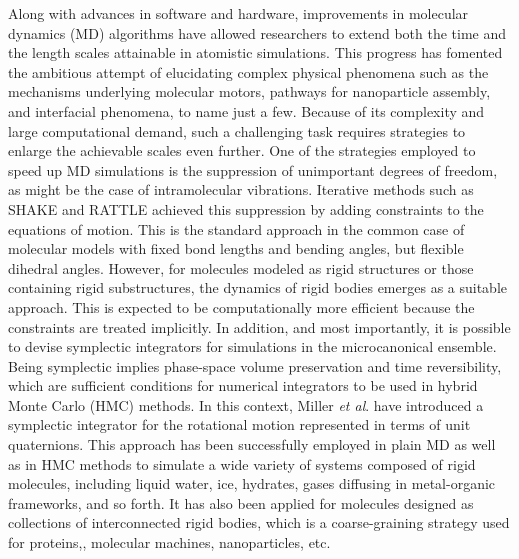 \documentclass[aip,jcp,reprint,amsmath,amssymb]{revtex4-1}
\begin{document}
\begin{itemize}
Along with advances in software and hardware, improvements in molecular dynamics (MD) algorithms have allowed researchers to extend both the time and the length scales attainable in atomistic simulations. This progress has fomented the ambitious attempt of elucidating complex physical phenomena such as the mechanisms underlying molecular motors, pathways for nanoparticle assembly, and interfacial phenomena, to name just a few. Because of its complexity and large computational demand, such a challenging task requires strategies to enlarge the achievable scales even further. One of the strategies employed to speed up MD simulations is the suppression of unimportant degrees of freedom, as might be the case of intramolecular vibrations. Iterative methods such as SHAKE\cite{Ryckaert1977} and RATTLE\cite{Andersen1983} achieved this suppression by adding constraints to the equations of motion. This is the standard approach in the common case of molecular models with fixed bond lengths and bending angles, but flexible dihedral angles. However, for molecules modeled as rigid structures or those containing rigid substructures,\cite{Miller2002} the dynamics of rigid bodies emerges as a suitable approach. This is expected to be computationally more efficient because the constraints are treated implicitly. In addition, and most importantly, it is possible to devise symplectic integrators for simulations in the microcanonical ensemble. Being symplectic implies phase-space volume preservation and time reversibility, which are sufficient conditions for numerical integrators to be used in hybrid Monte Carlo (HMC) methods.\cite{Duane1987} In this context, Miller \textit{et al}.\cite{Miller2002} have introduced a symplectic integrator for the rotational motion represented in terms of unit quaternions. This approach has been successfully employed in plain MD as well as in HMC methods to simulate a wide variety of systems composed of rigid molecules, including liquid water,\cite{Sakamaki2011, Reinhardt2012, Palmer2014, Gonzales2014} ice,\cite{Geiger2014} hydrates,\cite{Tribello2009, Gorman2012} gases diffusing in metal-organic frameworks,\cite{Ghoufi2010} and so forth. It has also been applied for molecules designed as collections of interconnected rigid bodies, which is a coarse-graining strategy used for proteins,\cite{Terada2003}, molecular machines,\cite{Akimov2008, Konyukhov2010} nanoparticles,\cite{Knorowski2012, Patra2013} etc.

\end{itemize}
\end{document}

